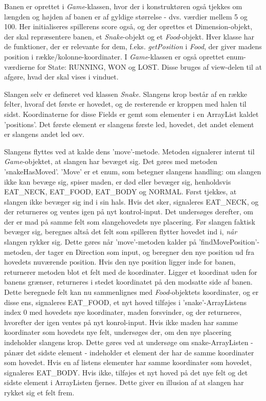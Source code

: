 Banen er oprettet i \textit{Game}-klassen, hvor der i konstruktøren også tjekkes om længden og højden af banen er af gyldige størrelse - dvs. værdier mellem 5 og 100. Her initialiseres spillerens score også, og der oprettes et Dimension-objekt, der skal repræsentere banen, et \textit{Snake}-objekt og et \textit{Food}-objekt. Hver klasse har de funktioner, der er relevante for dem, f.eks. \textit{getPosition} i \textit{Food}, der giver madens position i række/kolonne-koordinater. I \textit{Game}-klassen er også oprettet enum-værdierne for State: RUNNING, WON og LOST. Disse bruges af view-delen til at afgøre, hvad der skal vises i vinduet. 
\linebreak

Slangen selv er defineret ved klassen \textit{Snake}. Slangens krop består af en række felter, hvoraf det første er hovedet, og de resterende er kroppen med halen til sidst. Koordinaterne for disse Fields er gemt som elementer i en ArrayList kaldet 'positions'. Det første element er slangens første led, hovedet, det andet element er slangens andet led osv.
\newline

Slangens flyttes ved at kalde dens 'move'-metode. Metoden signalerer internt til \textit{Game}-objektet, at slangen har bevæget sig. Det gøres med metoden 'snakeHasMoved'. 'Move' er et enum, som betegner slangens handling: om slangen ikke kan bevæge sig, spiser maden, er død eller bevæger sig, henholdsvis EAT\_NECK, EAT\_FOOD, EAT\_BODY og NORMAL. Først tjekkes, at slangen ikke bevæger sig ind i sin hals. Hvis det sker, signaleres EAT\_NECK, og der returneres og ventes igen på nyt kontrol-input. Det undersøges derefter, om der er mad på samme felt som slangehovedets nye placering. Før slangen faktisk bevæger sig, beregnes altså det felt som spilleren flytter hovedet ind i, \textit{når} slangen rykker sig. Dette gøres når 'move'-metoden kalder på 'findMovePosition'-metoden, der tager en Direction som input, og beregner den nye position ud fra hovedets nuværende position. Hvis den nye position ligger inde for banen, returnerer metoden blot et felt med de koordinater. Ligger et koordinat uden for banens grænser, returneres i stedet koordinatet på den modsatte side af banen.
Dette beregnede felt kan nu sammenlignes med \textit{Food}-objektets koordinater, og er disse ens, signaleres EAT\_FOOD, et nyt hoved tilføjes i 'snake'-ArrayListens index 0 med hovedets nye koordinater, maden forsvinder, og der returneres, hvorefter der igen ventes på nyt konrol-input. Hvis ikke maden har samme koordinater som hovedets nye felt, undersøges der, om den nye placering indeholder slangens krop. Dette gøres ved at undersøge om snake-ArrayListen - pånær det sidste element - indeholder et element der har de samme koordinater som hovedet. Hvis en af listens elementer har samme koordinater som hovedet, signaleres EAT\_BODY. Hvis ikke, tilføjes et nyt hoved på det nye felt og det sidste element i ArrayListen fjernes. Dette giver en illusion af at slangen har rykket sig et felt frem.
\newline

